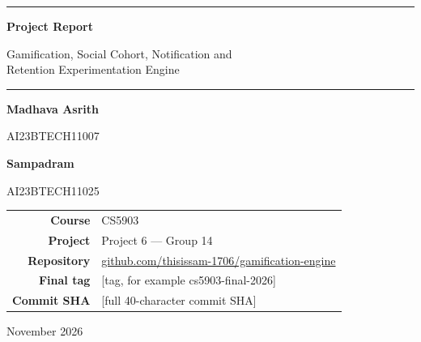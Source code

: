 \documentclass[11pt,a4paper]{article}
\newcommand{\todo}[1]{\textcolor{todo}{[#1]}}
\renewcommand{\_}{\textunderscore\allowbreak{}}
\begin{document}
\begin{titlepage}
    \centering
    \vspace*{2.2cm}

    {\color{accent}\rule{\textwidth}{1.6pt}\par}
    \vspace{1.4em}
    {\sffamily\bfseries\fontsize{26}{30}\selectfont\color{navy} Project Report\par}
    \vspace{0.9em}
    {\sffamily\large\color{navy} Gamification, Social Cohort, Notification and\\[0.2em] Retention Experimentation Engine\par}
    \vspace{1.4em}
    {\color{accent}\rule{\textwidth}{1.6pt}\par}

    \vspace{2.2cm}

    {\large \textbf{Madhava Asrith}\par}
    {\normalsize AI23BTECH11007\par}
    \vspace{1.0cm}
    {\large \textbf{Sampadram}\par}
    {\normalsize AI23BTECH11025\par}

    \vspace{1.8cm}

    \begin{tabular}{r l}
        \textbf{Course} & CS5903 \\
        \textbf{Project} & Project 6 --- Group 14 \\
        \textbf{Repository} & \href{https://github.com/thisissam-1706/gamification-engine}{\sffamily github.com/thisissam-1706/gamification-engine} \\
        \textbf{Final tag} & \todo{tag, for example cs5903-final-2026} \\
        \textbf{Commit SHA} & \todo{full 40-character commit SHA} \\
    \end{tabular}

    \vfill
    {\normalsize November 2026\par}
    \vspace*{1.2cm}
\end{titlepage}
\end{document}
